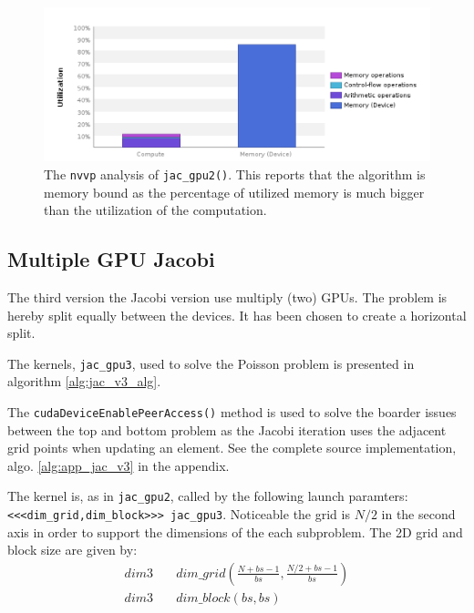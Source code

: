 \begin{figure}[H]
\centering
\includegraphics[width=1\textwidth]{data_3/pos_sceenshots/computebound.png}
\caption{The \texttt{nvvp} analysis of \texttt{jac\_gpu2()}. This reports that the algorithm is memory bound as the percentage of utilized memory is much bigger than the utilization of the computation.}
\label{fig:computebound}
\end{figure}




\subsection{Multiple GPU Jacobi}
The third version the Jacobi version use multiply (two) GPUs. The problem is hereby split equally between the devices. It has been chosen to create a horizontal split.

\noindent The kernels, \texttt{jac\_gpu3}, used to solve the Poisson problem is presented in algorithm \ref{alg:jac_v3_alg}. 

\noindent The \texttt{cudaDeviceEnablePeerAccess()} method is used to solve the boarder issues between the top and bottom problem as the Jacobi iteration uses the adjacent grid points when updating an element. See the complete source implementation, algo. \ref{alg:app_jac_v3} in the appendix.



\noindent The kernel is, as in \texttt{jac\_gpu2}, called by the following launch paramters: \texttt{<<<dim\_grid,dim\_block>>> jac\_gpu3}. Noticeable the grid is $N/2$ in the second axis in order to support the dimensions of the each subproblem. The 2D grid and block size are given by:
\begin{align}
dim3 \quad &dim\_grid \left(  \frac { N+bs-1 }{ bs },\frac { N/2+bs-1 }{ bs } \right)  \\
dim3\quad  &dim\_block\left(bs, bs \right)
\end{align}



